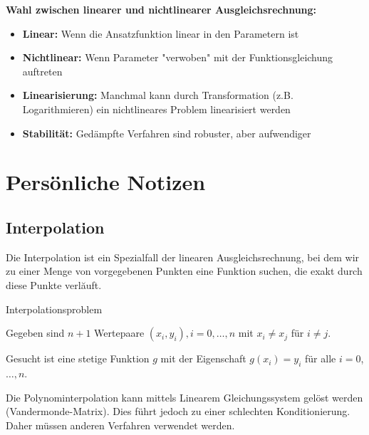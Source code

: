 \begin{remark}
\textbf{Wahl zwischen linearer und nichtlinearer Ausgleichsrechnung:}
\begin{itemize}
    \item \textbf{Linear:} Wenn die Ansatzfunktion linear in den Parametern ist
    \item \textbf{Nichtlinear:} Wenn Parameter "verwoben" mit der Funktionsgleichung auftreten
    \item \textbf{Linearisierung:} Manchmal kann durch Transformation (z.B. Logarithmieren) ein nichtlineares Problem linearisiert werden
    \item \textbf{Stabilität:} Gedämpfte Verfahren sind robuster, aber aufwendiger
\end{itemize}
\end{remark}

\section{Persönliche Notizen}

\subsection{Interpolation}

\begin{remark}
Die Interpolation ist ein Spezialfall der linearen Ausgleichsrechnung, bei dem wir zu einer Menge von vorgegebenen Punkten eine Funktion suchen, die exakt durch diese Punkte verlăuft.
\end{remark}

\begin{definition}{Interpolationsproblem}

Gegeben sind $n+1$ Wertepaare $\left(x_i, y_i\right), i=0, \ldots, n$ mit $x_i \neq x_j$ für $i \neq j$. 

Gesucht ist eine stetige Funktion $g$ mit der Eigenschaft $g\left(x_i\right)=y_i$ für alle $i=0$, $\ldots, n$.

Die Polynominterpolation kann mittels Linearem Gleichungssystem gelöst werden (Vandermonde-Matrix). 
Dies führt jedoch zu einer schlechten Konditionierung. Daher müssen anderen Verfahren verwendet werden.
\end{definition}

